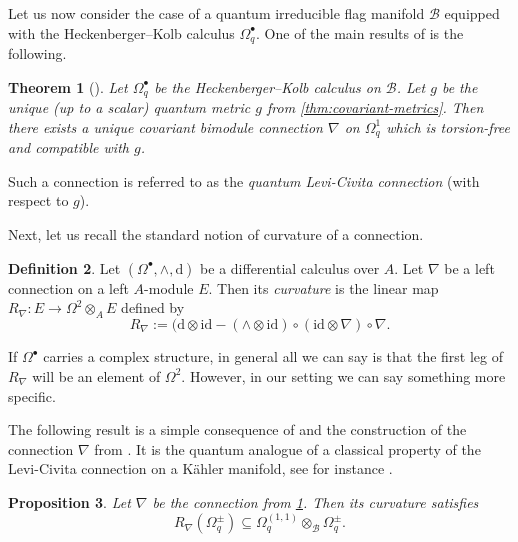 \documentclass[a4paper,12pt,reqno,english]{amsart}
\numberwithin{equation}{section}
\numberwithin{figure}{section}
\theoremstyle{plain}
\newtheorem{theorem}{Theorem}[section]
\theoremstyle{plain}
\theoremstyle{plain}
\newtheorem{proposition}[theorem]{Proposition}
\theoremstyle{plain}
\theoremstyle{plain}
\theoremstyle{definition}
\newtheorem{definition}[theorem]{Definition}
\theoremstyle{definition}
\theoremstyle{definition}
\theoremstyle{remark}
\theoremstyle{definition}
\newcommand{\qalg}{\mathcal{B}}
\newcommand{\id}{\mathrm{id}}
\newcommand{\diff}{\mathrm{d}}
\newcommand{\diffcalc}{\Omega_q}
\begin{document}
Let us now consider the case of a quantum irreducible flag manifold $\qalg$ equipped with the Heckenberger--Kolb calculus $\diffcalc^\bullet$.
One of the main results of \cite{levicivita-irreducible} is the following.

\begin{theorem}[{\cite[Theorem 6.14]{levicivita-irreducible}}]
\label{thm:unique-connection}
Let $\diffcalc^\bullet$ be the Heckenberger--Kolb calculus on $\qalg$. Let $g$ be the unique (up to a scalar) quantum metric $g$ from \cref{thm:covariant-metrics}.
Then there exists a unique covariant bimodule connection $\nabla$ on $\diffcalc^1$ which is torsion-free and compatible with $g$.
\end{theorem}

Such a connection is referred to as the \emph{quantum Levi-Civita connection} (with respect to $g$).

Next, let us recall the standard notion of curvature of a connection.

\begin{definition}
Let $(\Omega^\bullet, \wedge, \diff)$ be a differential calculus over $A$.
Let $\nabla$ be a left connection on a left $A$-module $E$.
Then its \emph{curvature} is the linear map $R_\nabla: E \to \Omega^2 \otimes_A E$ defined by
\[
R_\nabla := (\diff \otimes \id - (\wedge \otimes \id) \circ (\id \otimes \nabla) \circ \nabla.
\]
\end{definition}

If $\Omega^\bullet$ carries a complex structure, in general all we can say is that the first leg of $R_\nabla$ will be an element of $\Omega^2$.
However, in our setting we can say something more specific.

The following result is a simple consequence of \cite[Theorem 5.3]{quantum-book} and the construction of the connection $\nabla$ from \cite{levicivita-irreducible}.
It is the quantum analogue of a classical property of the Levi-Civita connection on a Kähler manifold, see for instance \cite[Chapter 12]{moroianu}.

\begin{proposition}
\label{prop:curvature-chern}
Let $\nabla$ be the connection from \cref{thm:unique-connection}.
Then its curvature satisfies
\[
R_{\nabla}(\diffcalc^{\pm}) \subseteq \diffcalc^{(1, 1)} \otimes_{\qalg} \diffcalc^{\pm}.
\]
\end{proposition}
\end{document}
